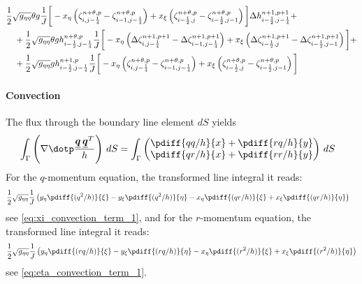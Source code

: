 \begin{align}
    & \frac{1}{2} \sqrt{g_{\eta\eta}} \theta g \frac{1}{J} \bigg[
    -x_\eta \left( \zeta^{n+\theta,p}_{i, j-\frac{1}{4}} - \zeta^{n+\theta,p}_{i-1, j-\frac{1}{4}} \right)
    + x_\xi \left( \zeta^{n+\theta,p}_{i-\frac{1}{2}, j} - \zeta^{n+\theta,p}_{i-\frac{1}{2}, j-1} \right) \bigg] \Delta h^{n+1, p+1}_{i-\frac{1}{2}, j-\frac{1}{4}} +
    \nonumber \\
    & \quad +
    \frac{1}{2} \sqrt{g_{\eta\eta}}  \theta g h^{n+\theta, p}_{i-\frac{1}{2}, j-\frac{1}{4}} \frac{1}{J} \bigg[ -x_\eta
    \left( \Delta \zeta^{n+1,p+1}_{i, j-\frac{1}{4}}  - \Delta \zeta^{n+1,p+1}_{i-1, j-\frac{1}{4}}\right)
    +x_\xi \left( \Delta \zeta^{n+1,p+1}_{i-\frac{1}{2}, j}  - \Delta \zeta^{n+1,p+1}_{i-\frac{1}{2}, j-1}  \right) \bigg] +
    \nonumber \\*
    & \quad + \frac{1}{2} \sqrt{g_{\eta\eta}} g h^{n+1, p}_{i-\frac{1}{2}, j-\frac{1}{4}} \frac{1}{J} \bigg[
    -x_\eta \left( \zeta^{n+\theta,p}_{i, j-\frac{1}{4}} - \zeta^{n+\theta,p}_{i-1, j-\frac{1}{4}} \right)
    +x_\xi \left( \zeta^{n+\theta,p}_{i-\frac{1}{2}, j} - \zeta^{n+\theta,p}_{i-\frac{1}{2}, j-1} \right) \bigg]
\end{align}
\paragraph*{Convection}
The flux through the boundary line element $dS$ yields
\begin{align}
    &\int_\Gamma \left( \nabla \dotp \frac{\vec{q}\,\vec{q}^T}{h}\right) \, dS =
    \int_\Gamma
    \begin{pmatrix}
        \pdiff{qq/h}{x} + \pdiff{rq/h}{y} \\
        \pdiff{qr/h}{x} + \pdiff{rr/h}{y}
    \end{pmatrix}
    \, dS
\end{align}
For the $q$-momentum equation, the transformed line integral it reads:
\begin{align}
    &
	\half\sqrt{g_{\eta\eta}} \frac{1}{J} \left(y_{\eta} \pdiff{(q^2/h)}{\xi} - y_{\xi} \pdiff{(q^2/h)}{\eta} -x_{\eta} \pdiff{(qr/h)}{\xi} + x_{\xi} \pdiff{(qr/h)}{\eta}\right)
\end{align}
see \autoref{eq:xi_convection_term_1},
and for the $r$-momentum equation, the transformed line integral it reads:
\begin{align}
    \half\sqrt{g_{\eta\eta}}
    \frac{1}{J} \left(y_{\eta} \pdiff{(rq/h)}{\xi} - y_{\xi} \pdiff{(rq/h)}{\eta} -x_{\eta} \pdiff{(r^2/h)}{\xi} + x_{\xi} \pdiff{(r^2/h)}{\eta}\right)
\end{align}
see \autoref{eq:eta_convection_term_1}.

